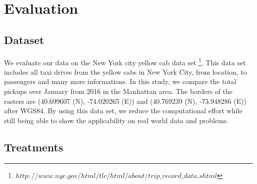 \documentclass[a4paper,UKenglish]{lipics-v2016}
\begin{document}
\section{Evaluation}

\subsection{Dataset}

We evaluate our data on the New York city yellow cab data set 
\footnote{$http://www.nyc.gov/html/tlc/html/about/trip\_record\_data.shtml$}. 
This data set includes all taxi drives from the yellow cabs in New York City, 
from location, to passengers and many more informations. In this study, we compare the 
total pickups over January from 2016 in the Manhattan area. 
The borders of the rasters are (40.699607 \textdegree  (N), -74.020265 \textdegree  (E)) 
and (40.769239 \textdegree  (N), -73.948286 \textdegree  (E)) after WGS84.
By using this data set, we reduce the computational effort while still 
being able to show the applicability on real world data and problems.
\subsection{Treatments}
\end{document}
